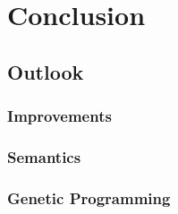 
\chapter{Conclusion}
\label{chapter:conclusion}


\section{Outlook}
\subsection{Improvements}
\subsection{Semantics}
\subsection{Genetic Programming}

